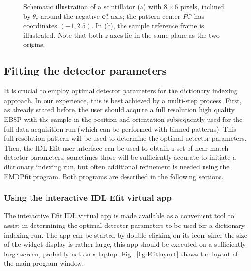 \documentclass[DIV=calc, paper=letter, fontsize=11pt]{scrartcl}	 %
\begin{document}
\begin{figure}[t]
\centering\leavevmode
\epsfxsize=4.0in
\caption{\label{fig:EBSDdetector}Schematic illustration of a scintillator (a) with $8\times 6$ pixels, inclined by $\theta_c$ around the negative $\mathbf{e}^d_x$ axis; the pattern
center $PC$ has coordinates $(-1,2.5)$.  In (b), the sample reference frame is illustrated.  Note that both $z$ axes lie in the same plane as the two origins.}
\end{figure}


%
%
%
%
%
%
%
%

\subsection{Fitting the detector parameters}
It is crucial to employ optimal detector parameters for the dictionary indexing approach.  In our experience, this is best achieved by a multi-step process.
First, as already stated before, the user should acquire a full resolution high quality EBSP with the sample in the position and orientation subsequently used for the 
full data acquisition run (which can be performed with binned patterns).  This full resolution pattern will be used to determine the optimal detector parameters.
Then, the IDL \textsf{Efit} user interface can be used to obtain a set of near-match detector parameters; sometimes those will be sufficiently accurate to initiate a dictionary indexing run, but often additional refinement is needed using the \textsf{EMDPfit} program.  Both programs are described in the following sections.

\subsubsection{Using the interactive IDL \textsf{Efit} virtual app}
The interactive \textsf{Efit} IDL virtual app is made available as a convenient tool to assist in determining the optimal detector parameters to be used for
a dictionary indexing run.  The app can be started by double clicking on its icon; since the size of the widget display is rather large, this app should be
executed on a sufficiently large screen, probably not on a laptop.  Fig.~\ref{fig:Efitlayout} shows the layout of the main program window.
\end{document}
